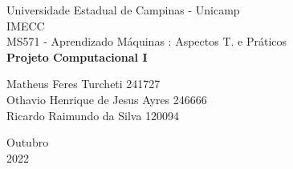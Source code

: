 \documentclass[a4paper, 12pt]{article}
\begin{document}

\begin{titlepage}
	\begin{center}
	

		\Huge{Universidade Estadual de Campinas - Unicamp}\\
		\large{IMECC}\\ 
		\large{MS571 - Aprendizado Máquinas : Aspectos T. e Práticos}\\ 
		\vspace{15pt}
        \vspace{95pt}
        \textbf{\LARGE{Projeto Computacional I }}\\
		\vspace{3,5cm}
	\end{center}
	
	\begin{flushleft}
		\begin{tabbing}
			Matheus Feres Turcheti 241727\\
            Othavio Henrique de Jesus Ayres 246666\\
            Ricardo Raimundo da Silva 120094\\
	\end{tabbing}
 \end{flushleft}
	\vspace{1cm}
	
	\begin{center}
		\vspace{\fill}
			 Outubro\\
		 2022
			\end{center}
\end{titlepage}


\newpage
\tableofcontents
\thispagestyle{empty}

\newpage
{}








% 
\newpage


\nocite{*}

\end{document}
